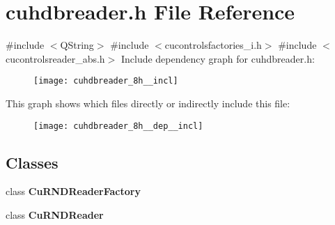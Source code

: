 \section{cuhdbreader.\+h File Reference}
\label{cuhdbreader_8h}
{\ttfamily \#include $<$Q\+String$>$}\newline
{\ttfamily \#include $<$cucontrolsfactories\+\_\+i.\+h$>$}\newline
{\ttfamily \#include $<$cucontrolsreader\+\_\+abs.\+h$>$}\newline
Include dependency graph for cuhdbreader.\+h\+:
\nopagebreak
\begin{figure}[H]
\begin{center}
\leavevmode
\texttt{[image: cuhdbreader\_8h\_\_incl]}
\end{center}
\end{figure}
This graph shows which files directly or indirectly include this file\+:
\nopagebreak
\begin{figure}[H]
\begin{center}
\leavevmode
\texttt{[image: cuhdbreader\_8h\_\_dep\_\_incl]}
\end{center}
\end{figure}
\subsection*{Classes}
\begin{DoxyCompactItemize}
\item 
class \textbf{ Cu\+R\+N\+D\+Reader\+Factory}
\item 
class \textbf{ Cu\+R\+N\+D\+Reader}
\end{DoxyCompactItemize}
